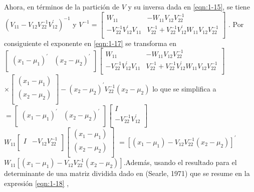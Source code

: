 Ahora, en términos de la partición de  $V$ y su inversa dada en \ref{eqn:1-15}, se tiene $\left(V_{11}-V_{12}V_{22}^{-1}V_{12}^\prime\right)^{-1} $  y  $V^{-1}=\left[\begin{matrix}W_{11}&-W_{11}V_{12}V_{22}^{-1}\\-V_{22}^{-1}V_{12}^\prime V_{11}&V_{22}^{-1}+V_{22}^{-1}V_{12}^\prime W_{11}V_{12}V_{22}^{-1}\\\end{matrix}\right]$ .  Por consiguiente el exponente en  \ref{eqn:1-17} se transforma en \\  $\left[\begin{matrix}\left(x_1-\mu_1\right)^\prime&\left(x_2-\mu_2\right)^\prime\\\end{matrix}\right]\left[\begin{matrix}W_{11}&-W_{11}V_{12}V_{22}^{-1}\\-V_{22}^{-1}V_{12}^\prime V_{11}&V_{22}^{-1}+V_{22}^{-1}V_{12}^\prime W_{11}V_{12}V_{22}^{-1}\\\end{matrix}\right]$ $\times\left[\begin{matrix}\left(x_1-\mu_1\right)\\\left(x_2-\mu_2\right)\\\end{matrix}\right]-\left(x_2-\mu_2\right)^\prime V_{22}^{-1}\left(x_2-\mu_2\right)$ lo que se simplifica a\\  $ =\left[\begin{matrix}\left(x_1-\mu_1\right)^\prime&\left(x_2-\mu_2\right)^\prime\\\end{matrix}\right]\left[\begin{matrix}I\\-V_{22}^{-1}V_{12}^\prime\\\end{matrix}\right]$ $W_{11}\left[\begin{matrix}I&-V_{12}V_{22}^{-1}\\\end{matrix}\right]\left[\begin{matrix}\left(x_1-\mu_1\right)\\\left(x_2-\mu_2\right)\\\end{matrix}\right]$ $=\left[\left(x_1-\mu_1\right)-V_{12}V_{22}^{-1}\left(x_2-\mu_2\right)\right]^\prime$ $W_{11}\left[\left(x_1-\mu_1\right)-V_{12}V_{22}^{-1}\left(x_2-\mu_2\right)\right]$.Además, usando el resultado para el determinante de una matriz dividida dado en (Searle, 1971) que se  resume en la expresión \ref{eqn:1-18} ,
